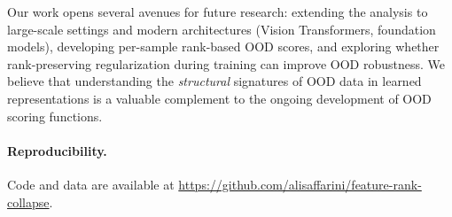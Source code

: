 \documentclass{article}
\begin{document}
Our work opens several avenues for future research: extending the analysis to large-scale settings and modern architectures (Vision Transformers, foundation models), developing per-sample rank-based OOD scores, and exploring whether rank-preserving regularization during training can improve OOD robustness. We believe that understanding the \emph{structural} signatures of OOD data in learned representations is a valuable complement to the ongoing development of OOD scoring functions.

\paragraph{Reproducibility.} Code and data are available at \url{https://github.com/alisaffarini/feature-rank-collapse}.

\end{document}
